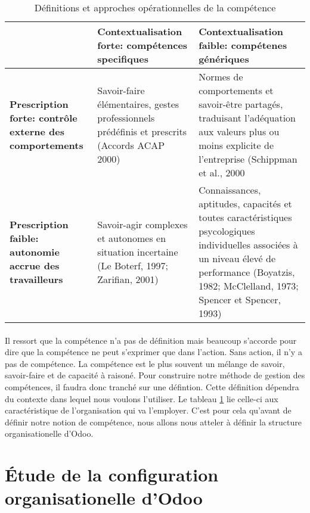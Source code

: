 \begin{table}
  \caption{Définitions et approches opérationnelles de la compétence\citep[pp.31]{delobbe}}
  \label{def_comp}

  \begin{center}
    \begin{tabular}{p{}|p{}|p{}}
       & \textbf{Contextualisation forte: compétences specifiques} & \textbf{Contextualisation faible: compétenes génériques}\\
       \hline
      \textbf{Prescription forte: contrôle externe des comportements}  & Savoir-faire élémentaires, gestes professionnels prédéfinis et prescrits (Accords ACAP 2000) & Normes de comportements et savoir-être partagés, traduisant l'adéquation aux valeurs plus ou moins explicite de l'entreprise (Schippman et al., 2000\\
      \hline
      \textbf{Prescription faible: autonomie accrue des travailleurs} & Savoir-agir complexes et autonomes en situation incertaine (Le Boterf, 1997; Zarifian, 2001)  & Connaissances, aptitudes, capacités et toutes caractéristiques psycologiques individuelles associées à un niveau élevé de performance (Boyatzis, 1982; McClelland, 1973; Spencer et Spencer, 1993)\\
    \end{tabular}
  \end{center}
\end{table}

\paragraph{}Il ressort que la compétence n'a pas de définition mais beaucoup s'accorde pour dire que la compétence ne peut s'exprimer que dans l'action. Sans action, il n'y a pas de compétence. La compétence est le plus souvent un mélange de savoir, savoir-faire et de capacité à raisoné. Pour construire notre méthode de gestion des compétences, il faudra donc tranché sur une défintion. Cette définition dépendra du contexte dans lequel nous voulons l'utiliser. Le tableau \ref{def_comp} lie celle-ci aux caractéristique de l'organisation qui va l'employer. C'est pour cela qu'avant de définir notre notion de compétence, nous allons nous atteler à définir la structure organisationelle d'Odoo.  

\section{Étude de la configuration organisationelle d'Odoo}
